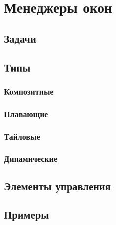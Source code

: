 \section{Менеджеры окон}
\subsection{Задачи}
\subsection{Типы}
\subsubsection{Композитные}
\subsubsection{Плавающие}
\subsubsection{Тайловые}
\subsubsection{Динамические}
\subsection{Элементы управления}
\subsection{Примеры}